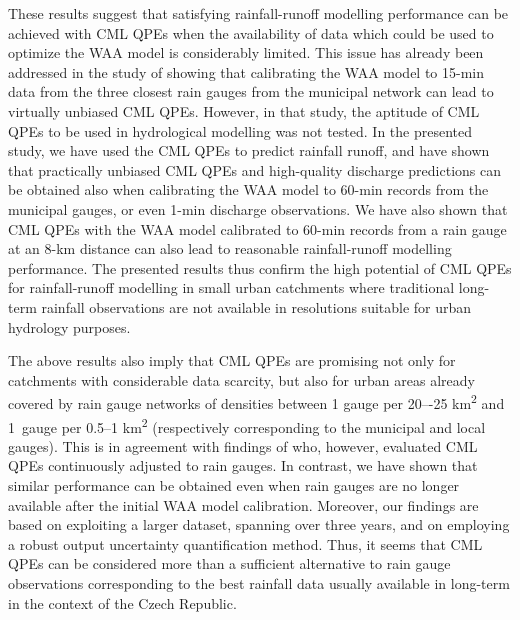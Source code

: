 \documentclass{ctuthesis}\usepackage[]{graphicx}\usepackage[]{color}
\begin{document}
These results suggest that satisfying rainfall-runoff modelling performance can be achieved with CML QPEs when the availability of data which could be used to optimize the WAA model is considerably limited. This issue has already been addressed in the study of \cite[][chapter \ref{chap6}]{pastorekPrecipitationEstimatesCommercial2022} showing that calibrating the WAA model to 15-min data from the three closest rain gauges from the municipal network can lead to virtually unbiased CML QPEs. However, in that study, the aptitude of CML QPEs to be used in hydrological modelling was not tested. In the presented study, we have used the CML QPEs to predict rainfall runoff, and have shown that practically unbiased CML QPEs and high-quality discharge predictions can be obtained also when calibrating the WAA model to 60-min records from the municipal gauges, or even 1-min discharge observations. We have also shown that CML QPEs with the WAA model calibrated to 60-min records from a rain gauge at an 8-km distance can also lead to reasonable rainfall-runoff modelling performance. The presented results thus confirm the high potential of CML QPEs for rainfall-runoff modelling in small urban catchments where traditional long-term rainfall observations are not available in resolutions suitable for urban hydrology purposes.


The above results also imply that CML QPEs are promising not only for catchments with considerable data scarcity, but also for urban areas already covered by rain gauge networks of densities between 1 gauge per 20–-25 km\textsuperscript{2} and 1~gauge per 0.5--1 km\textsuperscript{2} (respectively corresponding to the municipal and local gauges). This is in agreement with findings of  \citep{stranskyRunoffPredictionUsing2018, dischImpactDifferentSources2019} who, however, evaluated CML QPEs continuously adjusted to rain gauges. In contrast, we have shown that similar performance can be obtained even when rain gauges are no longer available after the initial WAA model calibration. Moreover, our findings are based on exploiting a larger dataset, spanning over three years, and on employing a robust output uncertainty quantification method. Thus, it seems that CML QPEs can be considered more than a sufficient alternative to rain gauge observations corresponding to the best rainfall data usually available in long-term in the context of the Czech Republic. 
\end{document}
